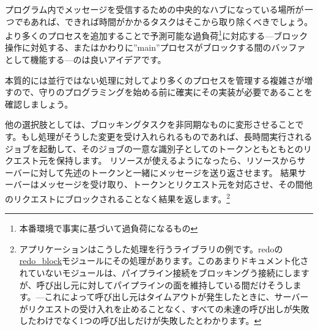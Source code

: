 プログラム内でメッセージを受信するための中央的なハブになっている場所が\emph{一つでも}あれば、できれば時間がかかるタスクはそこから取り除くべきでしょう。
より多くのプロセスを追加することで予測可能な過負荷\footnote{本番環境で事実に基づいて過負荷になるもの}に対応する---ブロック操作に対処する、またはかわりに''main''プロセスがブロックする間のバッファとして機能する---のは良いアイデアです。

本質的には並行ではない処理に対してより多くのプロセスを管理する複雑さが増すので、守りのプログラミングを始める前に確実にその実装が必要であることを確認しましょう。

他の選択肢としては、ブロッキングタスクを非同期なものに変形させることです。もし処理がそうした変更を受け入れられるものであれば、長時間実行されるジョブを起動して、そのジョブの一意な識別子としてのトークンともともとのリクエスト元を保持します。
リソースが使えるようになったら、リソースからサーバーに対して先述のトークンと一緒にメッセージを送り返させます。
結果サーバーはメッセージを受け取り、トークンとリクエスト元を対応させ、その間他のリクエストにブロックされることなく結果を返します。\footnote{アプリケーションはこうした処理を行うライブラリの例です。redoの\href{https://github.com/heroku/redo/blob/master/src/redo\_block.erl}{redo\_block}モジュールにその処理があります。このあまりドキュメント化されていないモジュールは、パイプライン接続をブロッキングう接続にしますが、呼び出し元に対してパイプラインの面を維持している間だけそうします。---これによって呼び出し元はタイムアウトが発生したときに、サーバーがリクエストの受け入れを止めることなく、すべての未達の呼び出しが失敗したわけでなく1つの呼び出しだけが失敗したとわかります。}

